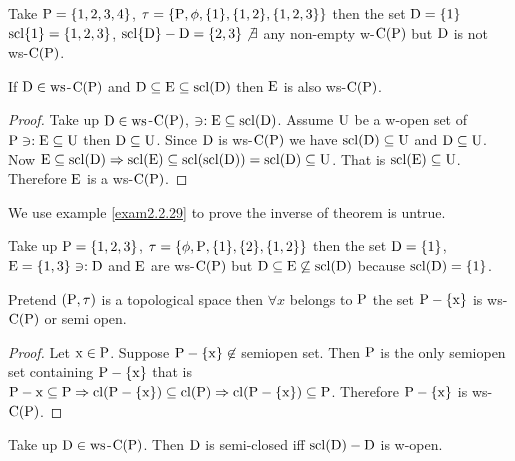 \begin{exm}\label{exam2.2.27}
Take $\mathrm{P}=\{1,2,3,4\}$, $\tau=\{\mathrm{P},\phi,\{1\},\{1, 2\},\{1,2,3\}\}$ then the set $\mathrm{D}=\{1\}$ $\mathrm{scl}\{1\}=\{1,2,3\}$, $\mathrm{scl}\{\mathrm{D}\}-\mathrm{D}=\{2,3\}\not\exists$ any non-empty w-$\mathrm{C}(\mathrm{P})$ but $\mathrm{D}$ is not ws-$\mathrm{C}(\mathrm{P})$.
\end{exm}

\begin{thm}\label{thm2.2.28}
If $\mathrm{D}\in\mathrm{ws}$-$\mathrm{C}(\mathrm{P})$ and $\mathrm{D}\subseteq \mathrm{E}\subseteq \mathrm{scl}(\mathrm{D})$ then $\mathrm{E}$ is also ws-$\mathrm{C}(\mathrm{P})$.
\end{thm}

\begin{proof}
Take up $\mathrm{D}\in \mathrm{ws}$-$\mathrm{C}(\mathrm{P})$, $\ni: \mathrm{E}\subseteq \mathrm{scl}(\mathrm{D})$. Assume $\mathrm{U}$ be a w-open set of $\mathrm{P} \ni: \mathrm{E}\subseteq \mathrm{U}$ then $\mathrm{D}\subseteq \mathrm{U}$. Since $\mathrm{D}$ is ws-$\mathrm{C}(\mathrm{P})$ we have $\mathrm{scl}(\mathrm{D})\subseteq \mathrm{U}$ and $\mathrm{D}\subseteq \mathrm{U}$. Now $\mathrm{E}\subseteq \mathrm{scl}(\mathrm{D})\Rightarrow\mathrm{scl}(\mathrm{E})\subseteq \mathrm{scl}(\mathrm{scl}(\mathrm{D}))=\mathrm{scl}(\mathrm{D})\subseteq \mathrm{U}$. That is $\mathrm{scl}(\mathrm{E})\subseteq \mathrm{U}$. Therefore $\mathrm{E}$ is a ws-$\mathrm{C}(\mathrm{P})$.
\end{proof}

We use example \ref{exam2.2.29} to prove the inverse of theorem is untrue.

\begin{exm}\label{exam2.2.29}
Take up $\mathrm{P} = \{1,2,3 \}$, $\tau = \{\phi, \mathrm{P}, \{1\}, \{2\}, \{1, 2\}\}$ then the set $\mathrm{D}=\{1\}$, $\mathrm{E}=\{1,3\}\ni:\mathrm{D}$ and $\mathrm{E}$ are ws-$\mathrm{C}(\mathrm{P})$ but $\mathrm{D}\subseteq \mathrm{E} \not\subseteq\mathrm{scl}(\mathrm{D})$ because $\mathrm{scl}(\mathrm{D})=\{1\}$.
\end{exm}

\begin{thm}\label{thm2.2.30}
Pretend $(\mathrm{P},\tau)$ is a topological space then $\forall x$ belongs to $\mathrm{P}$ the set $\mathrm{P}-\{\mathrm{x}\}$ is ws-$\mathrm{C}(\mathrm{P})$ or semi open.
\end{thm}

\begin{proof}
Let $\mathrm{x}\in\mathrm{P}$. Suppose $\mathrm{P}-\{\mathrm{x}\}\not\in$ semiopen set. Then $\mathrm{P}$ is the only semiopen set containing $\mathrm{P}-\{\mathrm{x}\}$ that is $\mathrm{P}-{\mathrm{x}} \subseteq \mathrm{P}\Rightarrow \mathrm{cl}(\mathrm{P}-\{\mathrm{x}\}) \subseteq \mathrm{cl}(\mathrm{P})\Rightarrow \mathrm{cl}(\mathrm{P}-\{\mathrm{x}\})\subseteq \mathrm{P}$. Therefore $\mathrm{P}-\{\mathrm{x}\}$ is ws-$\mathrm{C}(\mathrm{P})$.
\end{proof}

\begin{thm}\label{thm2.2.31}
Take up $\mathrm{D}\in \mathrm{ws}$-$\mathrm{C}(\mathrm{P})$. Then $\mathrm{D}$ is semi-closed iff $\mathrm{scl}(\mathrm{D})-\mathrm{D}$ is w-open.
\end{thm}


